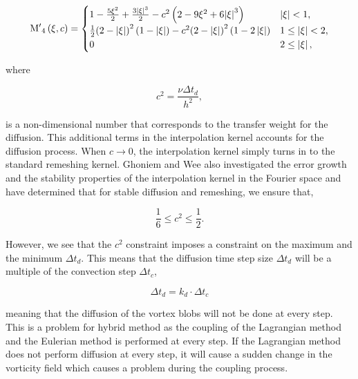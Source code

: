 \begin{equation}
{{{\rm{M'}}}_4}\left( {\xi ,c} \right) =
  \begin{cases}
   {1 - \frac{{5{\xi ^2}}}{2} + \frac{{3{{\left| \xi  \right|}^3}}}{2} - {c^2}\left( {2 - 9{\xi ^2} + 6{{\left| \xi  \right|}^3}} \right)} & {\left| \xi \right|} < 1, \\
   \frac{1}{2}{\left( {2 - \left| \xi  \right|} \right)^2}\left( {1 - \left| \xi  \right|} \right) - {c^2}{\left( {2 - \left| \xi  \right|} \right)^2}\left( {1 - 2\left| \xi  \right|} \right) & 1 \le {\left| \xi \right|} < 2,\\
   0 & 2 \le \left| \xi \right|,
  \end{cases}
\label{eq:modInterpKernel}
\end{equation}

where 

\begin{equation}
c^2 = \frac{\nu \Delta t_d}{h^2},
\label{eq:c2}
\end{equation}

is a non-dimensional number that corresponds to the transfer weight for the diffusion. This additional terms in the interpolation kernel accounts for the diffusion process. When $c \rightarrow 0$, the interpolation kernel simply turns in to the standard remeshing kernel. Ghoniem and Wee also investigated the error growth and the stability properties of the interpolation kernel in the Fourier space and have determined that for stable diffusion and remeshing, we ensure that,

\begin{equation}
\frac{1}{6} \le c^2 \le \frac{1}{2}.
\label{eq:c2stability}
\end{equation}

However, we see that the $c^2$ constraint imposes a constraint on the maximum and the minimum $\Delta t_d$. This means that the diffusion time step size $\Delta t_d$ will be a multiple of the convection step $\Delta t_c$,

	\begin{equation}
	\Delta t_d = k_d \cdot \Delta t_c
	\end{equation}

meaning that the diffusion of the vortex blobs will not be done at every step. This is a problem for hybrid method as the coupling of the Lagrangian method and the Eulerian method is performed at every step. If the Lagrangian method does not perform diffusion at every step, it will cause a sudden change in the vorticity field which causes a problem during the coupling process.

